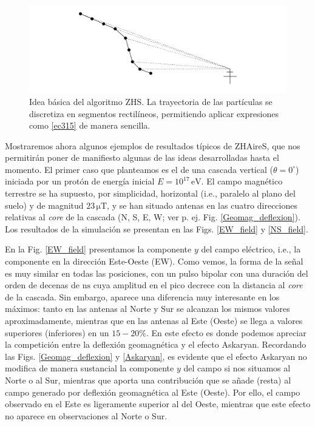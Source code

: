 \documentclass[11 pt, a4paper]{article} %
\numberwithin{equation}{section}
\numberwithin{figure}{section}
\numberwithin{table}{section}
\begin{document}
	\begin{figure}[H]
		\centering
		\includegraphics[width=.9\linewidth]{figures/ZHSsketch}
		\caption{Idea básica del algoritmo ZHS. La trayectoria de las partículas se discretiza en segmentos rectilíneos, permitiendo aplicar expresiones como \eqref{ec315} de manera sencilla.}
		\label{ZHSsketch}
	\end{figure}
 
Mostraremos ahora algunos ejemplos de resultados típicos de ZHAireS, que nos permitirán poner de manifiesto algunas de las ideas desarrolladas hasta el momento. El primer caso que planteamos es el de una cascada vertical ($\theta=0^\circ$) iniciada por un protón de energía inicial $E=10^{17}\,\mathrm{eV}$. El campo magnético terrestre se ha supuesto, por simplicidad, horizontal (i.e., paralelo al plano del suelo) y de magnitud $23\,\mathrm{\mu T}$, y se han situado antenas en las cuatro direcciones relativas al \textit{core} de la cascada (N, S, E, W; ver p. ej. Fig. \ref{Geomag_deflexion}). Los resultados de la simulación se presentan en las Figs. \ref{EW_field} y \ref{NS_field}. 

En la Fig. \ref{EW_field}  presentamos la componente $y$ del campo eléctrico, i.e., la componente en la dirección Este-Oeste (EW). Como vemos, la forma de la señal es muy similar en todas las posiciones, con un pulso bipolar con una duración del orden de decenas de $\mathrm{ns}$ cuya amplitud en el pico decrece con la distancia al \textit{core} de la cascada. Sin embargo, aparece una diferencia muy interesante en los máximos: tanto en las antenas al Norte y Sur se alcanzan los mismos valores aproximadamente, mientras que en las antenas al Este (Oeste) se llega a valores superiores (inferiores) en un $15-20\%$. En este efecto es donde podemos apreciar la competición entre la deflexión geomagnética y el efecto Askaryan. Recordando las Figs. \ref{Geomag_deflexion} y \ref{Askaryan}, es evidente que el efecto Askaryan no modifica de manera sustancial la componente $y$ del campo si nos situamos al Norte o al Sur, mientras que aporta una contribución que se añade (resta) al campo generado por deflexión geomagnética al Este (Oeste). Por ello, el campo observado en el Este es ligeramente superior al del Oeste, mientras que este efecto no aparece en observaciones al Norte o Sur.
\end{document}
